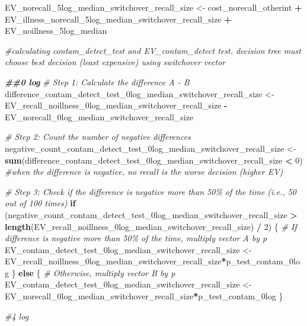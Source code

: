 \documentclass[
]{article}
\newenvironment{Shaded}{\begin{snugshade}}{\end{snugshade}}
\newcommand{\CommentTok}[1]{\textcolor[rgb]{0.56,0.35,0.01}{\textit{#1}}}
\newcommand{\ControlFlowTok}[1]{\textcolor[rgb]{0.13,0.29,0.53}{\textbf{#1}}}
\newcommand{\DecValTok}[1]{\textcolor[rgb]{0.00,0.00,0.81}{#1}}
\newcommand{\DocumentationTok}[1]{\textcolor[rgb]{0.56,0.35,0.01}{\textbf{\textit{#1}}}}
\newcommand{\FunctionTok}[1]{\textcolor[rgb]{0.13,0.29,0.53}{\textbf{#1}}}
\newcommand{\NormalTok}[1]{#1}
\newcommand{\OtherTok}[1]{\textcolor[rgb]{0.56,0.35,0.01}{#1}}
\newcommand{\SpecialCharTok}[1]{\textcolor[rgb]{0.81,0.36,0.00}{\textbf{#1}}}
\begin{document}
\begin{Shaded}
\begin{Highlighting}[]
\NormalTok{EV\_norecall\_5log\_median\_switchover\_recall\_size  }\OtherTok{\textless{}{-}}\NormalTok{ cost\_norecall\_otherint }\SpecialCharTok{+}\NormalTok{ EV\_illness\_norecall\_5log\_median\_switchover\_recall\_size  }\SpecialCharTok{+}\NormalTok{ EV\_noillness\_5log\_median}


\CommentTok{\#calculating contam\_detect\_test and EV\_contam\_detect test. decision tree must choose \textquotesingle{}best decision\textquotesingle{} (least expensive) using switchover vector}

\DocumentationTok{\#\#0 log}
\CommentTok{\# Step 1: Calculate the difference A {-} B}
\NormalTok{difference\_contam\_detect\_test\_0log\_median\_switchover\_recall\_size }\OtherTok{\textless{}{-}}\NormalTok{ EV\_recall\_noillness\_0log\_median\_switchover\_recall\_size }\SpecialCharTok{{-}}\NormalTok{ EV\_norecall\_0log\_median\_switchover\_recall\_size}

\CommentTok{\# Step 2: Count the number of negative differences}
\NormalTok{negative\_count\_contam\_detect\_test\_0log\_median\_switchover\_recall\_size }\OtherTok{\textless{}{-}} \FunctionTok{sum}\NormalTok{(difference\_contam\_detect\_test\_0log\_median\_switchover\_recall\_size }\SpecialCharTok{\textless{}} \DecValTok{0}\NormalTok{) }\CommentTok{\#when the difference is negative, no recall is the worse decision (higher EV)}

\CommentTok{\# Step 3: Check if the difference is negative more than 50\% of the time (i.e., 50 out of 100 times)}
\ControlFlowTok{if}\NormalTok{ (negative\_count\_contam\_detect\_test\_0log\_median\_switchover\_recall\_size }\SpecialCharTok{\textgreater{}} \FunctionTok{length}\NormalTok{(EV\_recall\_noillness\_0log\_median\_switchover\_recall\_size) }\SpecialCharTok{/} \DecValTok{2}\NormalTok{) \{}
  \CommentTok{\# If difference is negative more than 50\% of the time, multiply vector A by p}
\NormalTok{  EV\_contam\_detect\_test\_0log\_median\_switchover\_recall\_size }\OtherTok{\textless{}{-}}\NormalTok{ EV\_recall\_noillness\_0log\_median\_switchover\_recall\_size}\SpecialCharTok{*}\NormalTok{p\_test\_contam\_0log}
\NormalTok{\} }\ControlFlowTok{else}\NormalTok{ \{}
  \CommentTok{\# Otherwise, multiply vector B by p}
\NormalTok{ EV\_contam\_detect\_test\_0log\_median\_switchover\_recall\_size  }\OtherTok{\textless{}{-}}\NormalTok{ EV\_norecall\_0log\_median\_switchover\_recall\_size}\SpecialCharTok{*}\NormalTok{p\_test\_contam\_0log}
\NormalTok{\}}


\CommentTok{\#4 log}


\end{Highlighting}
\end{Shaded}
\end{document}
